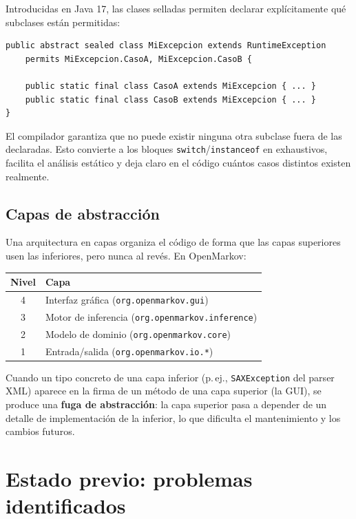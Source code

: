 \documentclass[12pt,a4paper]{article}
\begin{document}
Introducidas en Java 17, las clases selladas permiten declarar explícitamente
qué subclases están permitidas:

\begin{lstlisting}[caption={Ejemplo de clase sellada}]
public abstract sealed class MiExcepcion extends RuntimeException
    permits MiExcepcion.CasoA, MiExcepcion.CasoB {

    public static final class CasoA extends MiExcepcion { ... }
    public static final class CasoB extends MiExcepcion { ... }
}
\end{lstlisting}

El compilador garantiza que no puede existir ninguna otra subclase fuera de las
declaradas. Esto convierte a los bloques \texttt{switch}/\texttt{instanceof} en
exhaustivos, facilita el análisis estático y deja claro en el código cuántos
casos distintos existen realmente.

\subsection{Capas de abstracción}
\label{sec:capas}

Una arquitectura en capas organiza el código de forma que las capas superiores
usen las inferiores, pero nunca al revés. En OpenMarkov:

\begin{center}
\begin{tabular}{cl}
\toprule
Nivel & Capa \\
\midrule
4 & Interfaz gráfica (\texttt{org.openmarkov.gui}) \\
3 & Motor de inferencia (\texttt{org.openmarkov.inference}) \\
2 & Modelo de dominio (\texttt{org.openmarkov.core}) \\
1 & Entrada/salida (\texttt{org.openmarkov.io.*}) \\
\bottomrule
\end{tabular}
\end{center}

Cuando un tipo concreto de una capa inferior (p.\,ej., \texttt{SAXException} del
parser XML) aparece en la firma de un método de una capa superior (la GUI), se
produce una \textbf{fuga de abstracción}: la capa superior pasa a depender de un
detalle de implementación de la inferior, lo que dificulta el mantenimiento y
los cambios futuros.

\section{Estado previo: problemas identificados}
\label{sec:problemas}
\end{document}

